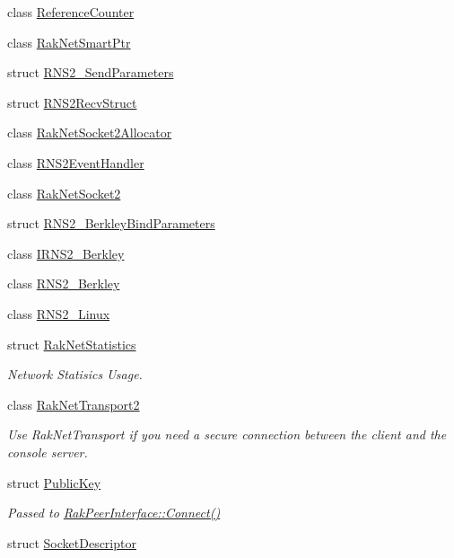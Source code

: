 \begin{DoxyCompactItemize}
class \hyperlink{class_rak_net_1_1_reference_counter}{Reference\-Counter}
\item 
class \hyperlink{class_rak_net_1_1_rak_net_smart_ptr}{Rak\-Net\-Smart\-Ptr}
\item 
struct \hyperlink{struct_rak_net_1_1_r_n_s2___send_parameters}{R\-N\-S2\-\_\-\-Send\-Parameters}
\item 
struct \hyperlink{struct_rak_net_1_1_r_n_s2_recv_struct}{R\-N\-S2\-Recv\-Struct}
\item 
class \hyperlink{class_rak_net_1_1_rak_net_socket2_allocator}{Rak\-Net\-Socket2\-Allocator}
\item 
class \hyperlink{class_rak_net_1_1_r_n_s2_event_handler}{R\-N\-S2\-Event\-Handler}
\item 
class \hyperlink{class_rak_net_1_1_rak_net_socket2}{Rak\-Net\-Socket2}
\item 
struct \hyperlink{struct_rak_net_1_1_r_n_s2___berkley_bind_parameters}{R\-N\-S2\-\_\-\-Berkley\-Bind\-Parameters}
\item 
class \hyperlink{class_rak_net_1_1_i_r_n_s2___berkley}{I\-R\-N\-S2\-\_\-\-Berkley}
\item 
class \hyperlink{class_rak_net_1_1_r_n_s2___berkley}{R\-N\-S2\-\_\-\-Berkley}
\item 
class \hyperlink{class_rak_net_1_1_r_n_s2___linux}{R\-N\-S2\-\_\-\-Linux}
\item 
struct \hyperlink{struct_rak_net_1_1_rak_net_statistics}{Rak\-Net\-Statistics}
\begin{DoxyCompactList}\small\item\em Network Statisics Usage. \end{DoxyCompactList}\item 
class \hyperlink{class_rak_net_1_1_rak_net_transport2}{Rak\-Net\-Transport2}
\begin{DoxyCompactList}\small\item\em Use Rak\-Net\-Transport if you need a secure connection between the client and the console server. \end{DoxyCompactList}\item 
struct \hyperlink{struct_rak_net_1_1_public_key}{Public\-Key}
\begin{DoxyCompactList}\small\item\em Passed to \hyperlink{class_rak_net_1_1_rak_peer_interface_a451dd5d225277fe5806d3d700551fb76}{Rak\-Peer\-Interface\-::\-Connect()} \end{DoxyCompactList}\item 
struct \hyperlink{struct_rak_net_1_1_socket_descriptor}{Socket\-Descriptor}

\end{DoxyCompactItemize}
